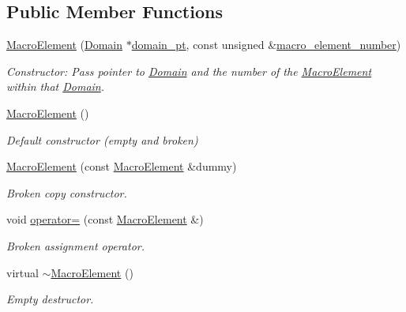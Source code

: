 \subsection*{Public Member Functions}
\begin{DoxyCompactItemize}
\item 
\hyperlink{classoomph_1_1MacroElement_ad94cc0ffda0d77e1778110da4aa651eb}{Macro\+Element} (\hyperlink{classoomph_1_1Domain}{Domain} $\ast$\hyperlink{classoomph_1_1MacroElement_ab086ff8cbdb656eff8ab5eafd67bca07}{domain\+\_\+pt}, const unsigned \&\hyperlink{classoomph_1_1MacroElement_acc146caf3839d234c62cf9a4de2fbe91}{macro\+\_\+element\+\_\+number})
\begin{DoxyCompactList}\small\item\em Constructor\+: Pass pointer to \hyperlink{classoomph_1_1Domain}{Domain} and the number of the \hyperlink{classoomph_1_1MacroElement}{Macro\+Element} within that \hyperlink{classoomph_1_1Domain}{Domain}. \end{DoxyCompactList}\item 
\hyperlink{classoomph_1_1MacroElement_affaa1d2975bac834846195c710d86760}{Macro\+Element} ()
\begin{DoxyCompactList}\small\item\em Default constructor (empty and broken) \end{DoxyCompactList}\item 
\hyperlink{classoomph_1_1MacroElement_a56dbe3369ce703354a63968146665615}{Macro\+Element} (const \hyperlink{classoomph_1_1MacroElement}{Macro\+Element} \&dummy)
\begin{DoxyCompactList}\small\item\em Broken copy constructor. \end{DoxyCompactList}\item 
void \hyperlink{classoomph_1_1MacroElement_a67d5e94fd6dc84aa2fad1b78178a362f}{operator=} (const \hyperlink{classoomph_1_1MacroElement}{Macro\+Element} \&)
\begin{DoxyCompactList}\small\item\em Broken assignment operator. \end{DoxyCompactList}\item 
virtual \hyperlink{classoomph_1_1MacroElement_abdc6cb9a63b44d4da0141dde40aa6310}{$\sim$\+Macro\+Element} ()
\begin{DoxyCompactList}\small\item\em Empty destructor. \end{DoxyCompactList}\item 

\end{DoxyCompactItemize}
